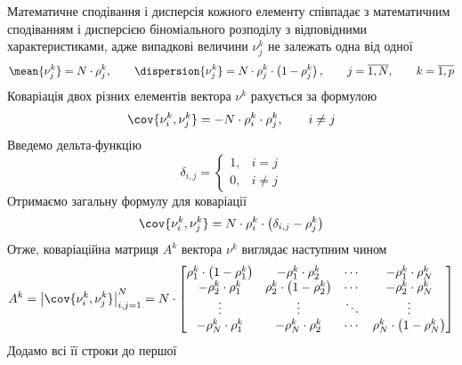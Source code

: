 Математичне сподівання і дисперсія кожного елементу співпадає з математичним
сподіванням і дисперсією біноміального розподілу з відповідними
характеристиками, адже випадкові величини $\nu_j^k$ не залежать одна від одної
\begin{equation*}
  \mean{\nu_j^k} = N \cdot \rho_j^k,\qquad
  \dispersion{\nu_j^k} = N \cdot \rho_j^k \cdot \left( 1 - \rho_j^k \right),
  \qquad j = \overline{1,N},
  \qquad k = \overline{1,p}
\end{equation*}
Коваріація двох різних елементів вектора $\nu^k$ рахується за формулою
\cite{Mukhopadhyay:2000}
\begin{equation*}
  \cov{\nu_i^k, \nu_j^k} = - N \cdot \rho_i^k \cdot \rho_j^k,
  \qquad i \neq j
\end{equation*}
Введемо дельта-функцію
\begin{equation*}
  \delta_{i, j} = \begin{cases}
    1,& i = j \\
    0,& i \neq j
  \end{cases}
\end{equation*}
Отримаємо загальну формулу для коваріації
\begin{equation*}
  \cov{\nu_i^k, \nu_j^k}
  = N \cdot \rho_i^k \cdot \left( \delta_{i, j} - \rho_j^k \right)
\end{equation*}
Отже, коваріаційна матриця $A^k$ вектора $\nu^k$ виглядає наступним чином
\begin{equation*}
  A^k
  = \left| \cov{\nu_i^k, \nu_j^k} \right|_{i,j=1}^N
  = N \cdot
   \begin{bmatrix}
      \rho_1^k \cdot \left( 1 - \rho_1^k \right) & - \rho_1^k \cdot \rho_2^k
              & \cdots & - \rho_1^k \cdot \rho_N^k \\

      - \rho_2^k \cdot \rho_1^k                  & \rho_2^k \cdot
          \left( 1 - \rho_2^k \right) & \cdots & - \rho_2^k \cdot \rho_N^k \\

      \vdots                                     & \vdots
              & \ddots & \vdots \\

       - \rho_N^k \cdot \rho_1^k                 & - \rho_N^k \cdot \rho_2^k
              & \cdots & \rho_N^k \cdot \left( 1 - \rho_N^k \right)
    \end{bmatrix}
\end{equation*}
Додамо всі її строки до першої
